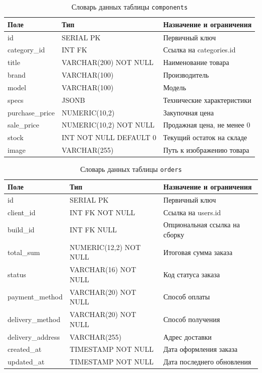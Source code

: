 \begin{table}[ht!]
\caption{Словарь данных таблицы \texttt{components}}
\label{tab:dd-components}
\small
\begin{tabularx}{\textwidth}{|>{\RaggedRight\arraybackslash}p{}|>{\RaggedRight\arraybackslash}p{}|>{\RaggedRight\arraybackslash}X|}
\hline
\textbf{Поле} & \textbf{Тип} & \textbf{Назначение и ограничения} \\ \hline
id & SERIAL PK & Первичный ключ \\ \hline
category\_id & INT FK & Ссылка на categories.id \\ \hline
title & VARCHAR(200) NOT NULL & Наименование товара \\ \hline
brand & VARCHAR(100) & Производитель \\ \hline
model & VARCHAR(100) & Модель \\ \hline
specs & JSONB & Технические характеристики \\ \hline
purchase\_price & NUMERIC(10,2) & Закупочная цена \\ \hline
sale\_price & NUMERIC(10,2) NOT NULL & Продажная цена, не менее 0 \\ \hline
stock & INT NOT NULL DEFAULT 0 & Текущий остаток на складе \\ \hline
image & VARCHAR(255) & Путь к изображению товара \\ \hline
\end{tabularx}
\end{table}

\begin{table}[ht!]
\caption{Словарь данных таблицы \texttt{orders}}
\label{tab:dd-orders}
\small
\begin{tabularx}{\textwidth}{|>{\RaggedRight\arraybackslash}p{}|>{\RaggedRight\arraybackslash}p{}|>{\RaggedRight\arraybackslash}X|}
\hline
\textbf{Поле} & \textbf{Тип} & \textbf{Назначение и ограничения} \\ \hline
id & SERIAL PK & Первичный ключ \\ \hline
client\_id & INT FK NOT NULL & Ссылка на users.id \\ \hline
build\_id & INT FK NULL & Опциональная ссылка на сборку \\ \hline
total\_sum & NUMERIC(12,2) NOT NULL & Итоговая сумма заказа \\ \hline
status & VARCHAR(16) NOT NULL & Код статуса заказа \\ \hline
payment\_method & VARCHAR(20) NOT NULL & Способ оплаты \\ \hline
delivery\_method & VARCHAR(20) NOT NULL & Способ получения \\ \hline
delivery\_address & VARCHAR(255) & Адрес доставки \\ \hline
created\_at & TIMESTAMP NOT NULL & Дата оформления заказа \\ \hline
updated\_at & TIMESTAMP NOT NULL & Дата последнего обновления \\ \hline
\end{tabularx}
\end{table}

